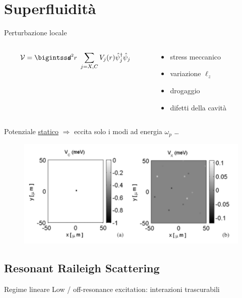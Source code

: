 \documentclass[10pt]{beamer}
\begin{document}
\section{Superfluidità}
\begin{frame}{Perturbazione locale}
\begin{columns}
	\begin{column}{.5\textwidth}
	  \[
	\mathcal{V} = \intr \sum_{j=X,C} V_j(r) \opsi_j^\dagger \opsi_j
	  \]
	\end{column}
	
	\begin{column}{.5\textwidth}
	    \begin{itemize}
	      \item stress meccanico
	      \item variazione $\ell_z$
	      \item drogaggio
	      \item difetti della cavità
	    \end{itemize}

	\end{column}
\end{columns}
\vspace{10pt}
Potenziale \underline{statico} $\Rightarrow$ eccita solo i modi ad energia $\omega_p$ \dots

\begin{figure}
  \includegraphics[width=.7\textwidth]{pics/potentials.png}
\end{figure}



 \end{frame}

\subsection{Resonant Raileigh Scattering}
\begin{frame}{Regime lineare}
Low / off-resonance excitation: interazioni trascurabili
\end{frame}
\end{document}
